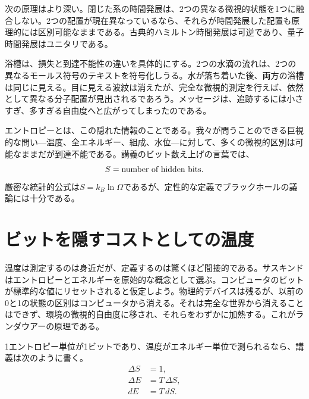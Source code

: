 \begin{classroomqa}
\end{classroomqa}

次の原理はより深い。閉じた系の時間発展は、2つの異なる微視的状態を1つに融合しない。2つの配置が現在異なっているなら、それらが時間発展した配置も原理的には区別可能なままである。古典的ハミルトン時間発展は可逆であり、量子時間発展はユニタリである。

浴槽は、損失と到達不能性の違いを具体的にする。2つの水滴の流れは、2つの異なるモールス符号のテキストを符号化しうる。水が落ち着いた後、両方の浴槽は同じに見える。目に見える波紋は消えたが、完全な微視的測定を行えば、依然として異なる分子配置が見出されるであろう。メッセージは、追跡するには小さすぎ、多すぎる自由度へと広がってしまったのである。

エントロピーとは、この隠れた情報のことである。我々が問うことのできる巨視的な問い---温度、全エネルギー、組成、水位---に対して、多くの微視的区別は可能なままだが到達不能である。講義のビット数え上げの言葉では、
\begin{equation}
S=\hbox{number of hidden bits}.
\end{equation}
厳密な統計的公式は\(S=k_B\ln\Omega\)であるが、定性的な定義でブラックホールの議論には十分である。

\section{ビットを隠すコストとしての温度}

温度は測定するのは身近だが、定義するのは驚くほど間接的である。サスキンドはエントロピーとエネルギーを原始的な概念として選ぶ。コンピュータのビットが標準的な値にリセットされると仮定しよう。物理的デバイスは残るが、以前の0と1の状態の区別はコンピュータから消える。それは完全な世界から消えることはできず、環境の微視的自由度に移され、それらをわずかに加熱する。これがランダウアーの原理である。

1エントロピー単位が1ビットであり、温度がエネルギー単位で測られるなら、講義は次のように書く。
\begin{align}
\Delta S&=1,\\
\Delta E&=T\,\Delta S,\\
dE&=T\,dS.
\label{eq:first-law}
\end{align}

